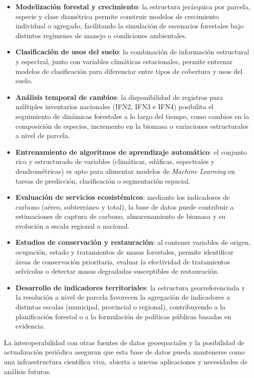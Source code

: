\begin{itemize}
    \item \textbf{Modelización forestal y crecimiento}: la estructura jerárquica por parcela, especie y clase diamétrica permite construir modelos de crecimiento individual o agregado, facilitando la simulación de escenarios forestales bajo distintos regímenes de manejo o condiciones ambientales.

    \item \textbf{Clasificación de usos del suelo}: la combinación de información estructural y espectral, junto con variables climáticas estacionales, permite entrenar modelos de clasificación para diferenciar entre tipos de cobertura y usos del suelo.

    \item \textbf{Análisis temporal de cambios}: la disponibilidad de registros para múltiples inventarios nacionales (IFN2, IFN3 e IFN4) posibilita el seguimiento de dinámicas forestales a lo largo del tiempo, como cambios en la composición de especies, incremento en la biomasa o variaciones estructurales a nivel de parcela.

    \item \textbf{Entrenamiento de algoritmos de aprendizaje automático}: el conjunto rico y estructurado de variables (climáticas, edáficas, espectrales y dendrométricas) es apto para alimentar modelos de \textit{Machine Learning} en tareas de predicción, clasificación o segmentación espacial.

    \item \textbf{Evaluación de servicios ecosistémicos}: mediante los indicadores de carbono (aéreo, subterráneo y total), la base de datos puede contribuir a estimaciones de captura de carbono, almacenamiento de biomasa y su evolución a escala regional o nacional.

    \item \textbf{Estudios de conservación y restauración}: al contener variables de origen, ocupación, estado y tratamientos de masas forestales, permite identificar áreas de conservación prioritaria, evaluar la efectividad de tratamientos selvícolas o detectar masas degradadas susceptibles de restauración.

    \item \textbf{Desarrollo de indicadores territoriales}: la estructura georreferenciada y la resolución a nivel de parcela favorecen la agregación de indicadores a distintas escalas (municipal, provincial o regional), contribuyendo a la planificación forestal o a la formulación de políticas públicas basadas en evidencia.
\end{itemize}

La interoperabilidad con otras fuentes de datos geoespaciales y la posibilidad de actualización periódica aseguran que esta base de datos pueda mantenerse como una infraestructura científica viva, abierta a nuevas aplicaciones y necesidades de análisis futuras.


